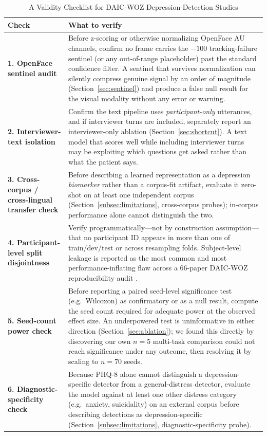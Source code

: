 \documentclass[journal]{IEEEtran}
\begin{document}
\begin{table}[t]
\centering
\renewcommand{\arraystretch}{1.3}
\caption{A Validity Checklist for DAIC-WOZ Depression-Detection Studies}
\label{tab:checklist}
\begin{tabular}{p{}p{}}
\toprule
\textbf{Check} & \textbf{What to verify} \\
\midrule
\textbf{1. OpenFace sentinel audit} &
Before z-scoring or otherwise normalizing OpenFace AU channels, confirm
no frame carries the $-100$ tracking-failure sentinel (or any
out-of-range placeholder) past the standard confidence filter. A
sentinel that survives normalization can silently compress genuine
signal by an order of magnitude (Section~\ref{sec:sentinel}) and
produce a false null result for the visual modality without any
error or warning. \\[2pt]
\textbf{2. Interviewer-text isolation} &
Confirm the text pipeline uses \emph{participant-only} utterances, and
if interviewer turns are included, separately report an
interviewer-only ablation (Section~\ref{sec:shortcut}). A text model
that scores well while including interviewer turns may be exploiting
which questions get asked rather than what the patient says. \\[2pt]
\textbf{3. Cross-corpus / cross-lingual transfer check} &
Before describing a learned representation as a depression
\emph{biomarker} rather than a corpus-fit artifact, evaluate it
zero-shot on at least one independent corpus
(Section~\ref{subsec:limitations}, cross-corpus probes); in-corpus
performance alone cannot distinguish the two. \\[2pt]
\textbf{4. Participant-level split disjointness} &
Verify programmatically---not by construction assumption---that no
participant ID appears in more than one of train/dev/test or across
resampling folds. Subject-level leakage is reported as the most
common and most performance-inflating flaw across a 66-paper
DAIC-WOZ reproducibility audit \cite{danylenko2026}. \\[2pt]
\textbf{5. Seed-count power check} &
Before reporting a paired seed-level significance test (e.g.\
Wilcoxon) as confirmatory or as a null result, compute the seed count
required for adequate power at the observed effect size. An
underpowered test is uninformative in either direction
(Section~\ref{sec:ablation}); we found this directly by discovering our own
$n{=}5$ multi-task comparison could not reach significance under any
outcome, then resolving it by scaling to $n{=}70$ seeds. \\[2pt]
\textbf{6. Diagnostic-specificity check} &
Because PHQ-8 alone cannot distinguish a depression-specific detector
from a general-distress detector, evaluate the model against at least
one other distress category (e.g.\ anxiety, suicidality) on an
external corpus before describing detections as depression-specific
(Section~\ref{subsec:limitations}, diagnostic-specificity probe). \\
\bottomrule
\end{tabular}
\end{table}
\end{document}
